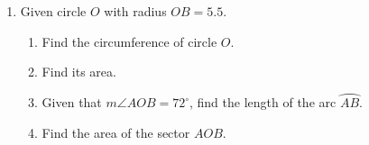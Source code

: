 \documentclass[12pt, twoside]{article}
\begin{document}
\begin{enumerate}
\newpage
\item Given circle $O$ with radius $OB=5.5$.\\[0.5cm]
   \begin{enumerate}
     \item Find the circumference of circle $O$. \vspace{2.5cm}
     \item Find its area.  \vspace{4cm}
     \item Given that $m\angle AOB=72^\circ$, find the length of the arc $\wideparen{AB}$. \vspace{3cm}%
     \item Find the area of the sector $AOB$. \vspace{1.5cm}
   \end{enumerate}

\end{enumerate}
\end{document}
